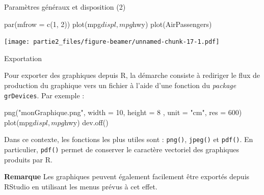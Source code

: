 \documentclass[12pt,ignorenonframetext,]{beamer}
\newenvironment{Shaded}{}{}
\newcommand{\DataTypeTok}[1]{#1}
\newcommand{\DecValTok}[1]{#1}
\newcommand{\KeywordTok}[1]{\textcolor[rgb]{0.00,0.00,1.00}{#1}}
\newcommand{\NormalTok}[1]{#1}
\newcommand{\OperatorTok}[1]{#1}
\newcommand{\StringTok}[1]{\textcolor[rgb]{0.00,0.50,0.50}{#1}}
\renewenvironment{Shaded}{\begin{snugshade}}{\end{snugshade}}
\newcommand{\intertitre}[1]{\textcolor{redInsee}{\textbf{#1}}}
\begin{document}
\begin{frame}[fragile]{Paramètres généraux et disposition (2)}
\protect\hypertarget{parametres-generaux-et-disposition-2}{}

\begin{Shaded}
\begin{Highlighting}[]
\KeywordTok{par}\NormalTok{(}\DataTypeTok{mfrow =} \KeywordTok{c}\NormalTok{(}\DecValTok{1}\NormalTok{, }\DecValTok{2}\NormalTok{))}
\KeywordTok{plot}\NormalTok{(mpg}\OperatorTok{$}\NormalTok{displ, mpg}\OperatorTok{$}\NormalTok{hwy)}
\KeywordTok{plot}\NormalTok{(AirPassengers)}
\end{Highlighting}
\end{Shaded}

\texttt{[image: partie2\_files/figure-beamer/unnamed-chunk-17-1.pdf]}

\end{frame}

\begin{frame}[fragile]{Exportation}
\protect\hypertarget{exportation}{}

Pour exporter des graphiques depuis R, la démarche consiste à rediriger
le flux de production du graphique vers un fichier à l’aide d’une
fonction du \emph{package} \texttt{grDevices}. Par exemple :

\pause

\begin{Shaded}
\begin{Highlighting}[]
\KeywordTok{png}\NormalTok{(}\StringTok{"monGraphique.png"}\NormalTok{, }\DataTypeTok{width =} \DecValTok{10}\NormalTok{, }\DataTypeTok{height =} \DecValTok{8}
\NormalTok{    , }\DataTypeTok{unit =} \StringTok{"cm"}\NormalTok{, }\DataTypeTok{res =} \DecValTok{600}\NormalTok{)}
\KeywordTok{plot}\NormalTok{(mpg}\OperatorTok{$}\NormalTok{displ, mpg}\OperatorTok{$}\NormalTok{hwy)}
\KeywordTok{dev.off}\NormalTok{()}
\end{Highlighting}
\end{Shaded}

\pause Dans ce contexte, les fonctions les plus utiles sont :
\texttt{png()}, \texttt{jpeg()} et \texttt{pdf()}. En particulier,
\texttt{pdf()} permet de conserver le caractère vectoriel des graphiques
produits par R.

\pause

\intertitre{Remarque} Les graphiques peuvent également facilement être
exportés depuis RStudio en utilisant les menus prévus à cet effet.

\end{frame}
\end{document}
